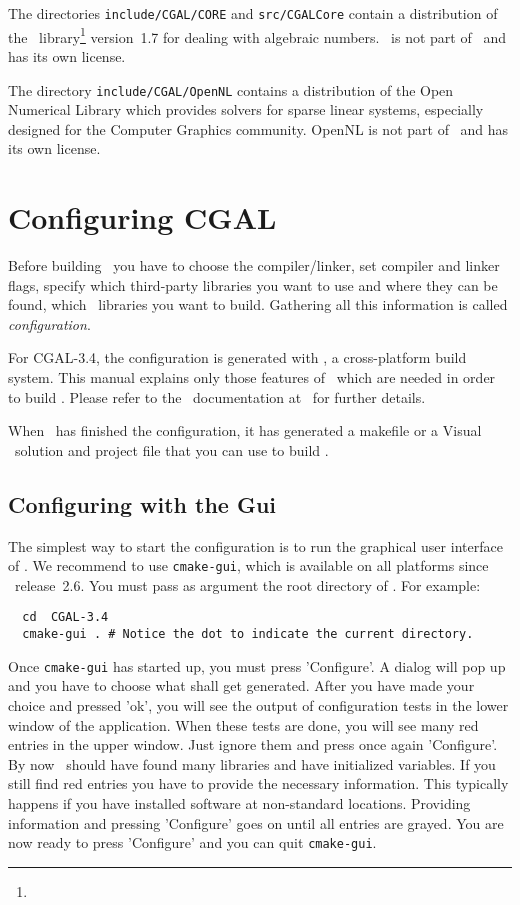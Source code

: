 The directories \texttt{include/CGAL/CORE} and \texttt{src/CGALCore} contain a
distribution of the \core\ library\footnote{\corepage} version~1.7 for
dealing with algebraic numbers. \core\ is not part of \cgal\ and has its own license.


The directory \texttt{include/CGAL/OpenNL} contains a distribution of the 
Open Numerical Library which provides solvers for sparse linear systems, especially designed 
for the Computer Graphics community. OpenNL is not part of \cgal\ and has its own license.

\section{Configuring CGAL}

Before building \cgal\ you have to choose the compiler/linker, 
set compiler and linker  flags, specify which
third-party libraries you want to use and where they can be found, 
which \cgal\ libraries you want to build. Gathering
all this information is called {\em configuration}. 

For CGAL-3.4, the configuration is generated with \cmake, a
cross-platform build system.  This manual explains only those features of
\cmake\ which are needed in order to build \cgal. Please refer to the \cmake\ 
documentation at \cmakepage\ for further details.

When \cmake\ has finished the configuration, it has generated
a makefile or a Visual \CC\  solution and project file that you 
can use to build \cgal.

\subsection{Configuring \cgal{} with the \cmake{} {\sc Gui} }

The simplest way to start the configuration is to run the graphical
user interface of \cmake. We recommend to use \texttt{cmake-gui}, which
is available on all platforms since \cmake\ release~2.6.   You must pass as 
argument the root directory of \cgal. For example:

{\ccTexHtml{\scriptsize}{}
\begin{verbatim}
  cd  CGAL-3.4
  cmake-gui . # Notice the dot to indicate the current directory.
\end{verbatim}
}

Once \texttt{cmake-gui} has started up, you must press 'Configure'. 
A dialog will pop up and you have to choose what shall get generated.
After you have made your choice and pressed 'ok', you will see
the output of configuration tests in the lower window of the application. 
When these tests are done, you will see many
red entries in the upper window. Just ignore them and  press once again  'Configure'. 
By now \cmake\ should have found many libraries and have initialized variables. 
If you still find red entries you have to provide the necessary information. 
This typically happens if you have installed software at non-standard locations.
Providing information and pressing 'Configure' goes on until 
all entries are grayed. You are now ready to press 'Configure' and you
can quit \texttt{cmake-gui}.

